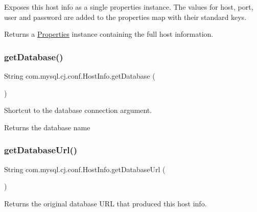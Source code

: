 Exposes this host info as a single properties instance. The values for host, port, user and password are added to the properties map with their standard keys.

\begin{DoxyReturn}{Returns}
a \mbox{\hyperlink{}{Properties}} instance containing the full host information. 
\end{DoxyReturn}
\mbox{\label{classcom_1_1mysql_1_1cj_1_1conf_1_1_host_info_aac3a26a2ad40c40bd6a2a8dfb4856a58}} 
\subsubsection{\texorpdfstring{get\+Database()}{getDatabase()}}
{\footnotesize\ttfamily String com.\+mysql.\+cj.\+conf.\+Host\+Info.\+get\+Database (\begin{DoxyParamCaption}{ }\end{DoxyParamCaption})}

Shortcut to the database connection argument.

\begin{DoxyReturn}{Returns}
the database name 
\end{DoxyReturn}
\mbox{\label{classcom_1_1mysql_1_1cj_1_1conf_1_1_host_info_a84c5d1cc48b3d5d1d9911513777f9152}} 
\subsubsection{\texorpdfstring{get\+Database\+Url()}{getDatabaseUrl()}}
{\footnotesize\ttfamily String com.\+mysql.\+cj.\+conf.\+Host\+Info.\+get\+Database\+Url (\begin{DoxyParamCaption}{ }\end{DoxyParamCaption})}

Returns the original database U\+RL that produced this host info.

